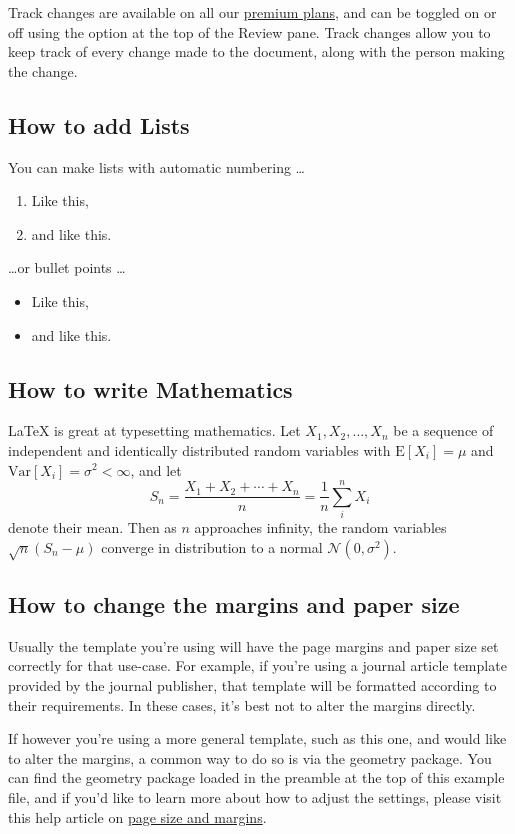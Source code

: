 \documentclass{article}
\begin{document}
Track changes are available on all our \href{https://www.overleaf.com/user/subscription/plans}{premium plans}, and can be toggled on or off using the option at the top of the Review pane. Track changes allow you to keep track of every change made to the document, along with the person making the change.

\subsection{How to add Lists}

You can make lists with automatic numbering \dots

\begin{enumerate}
\item Like this,
\item and like this.
\end{enumerate}
\dots or bullet points \dots
\begin{itemize}
\item Like this,
\item and like this.
\end{itemize}

\subsection{How to write Mathematics}

\LaTeX{} is great at typesetting mathematics. Let $X_1, X_2, \ldots, X_n$ be a sequence of independent and identically distributed random variables with $\text{E}[X_i] = \mu$ and $\text{Var}[X_i] = \sigma^2 < \infty$, and let
\[S_n = \frac{X_1 + X_2 + \cdots + X_n}{n}
      = \frac{1}{n}\sum_{i}^{n} X_i\]
denote their mean. Then as $n$ approaches infinity, the random variables $\sqrt{n}(S_n - \mu)$ converge in distribution to a normal $\mathcal{N}(0, \sigma^2)$.


\subsection{How to change the margins and paper size}

Usually the template you're using will have the page margins and paper size set correctly for that use-case. For example, if you're using a journal article template provided by the journal publisher, that template will be formatted according to their requirements. In these cases, it's best not to alter the margins directly.

If however you're using a more general template, such as this one, and would like to alter the margins, a common way to do so is via the geometry package. You can find the geometry package loaded in the preamble at the top of this example file, and if you'd like to learn more about how to adjust the settings, please visit this help article on \href{https://www.overleaf.com/learn/latex/page_size_and_margins}{page size and margins}.
\end{document}
